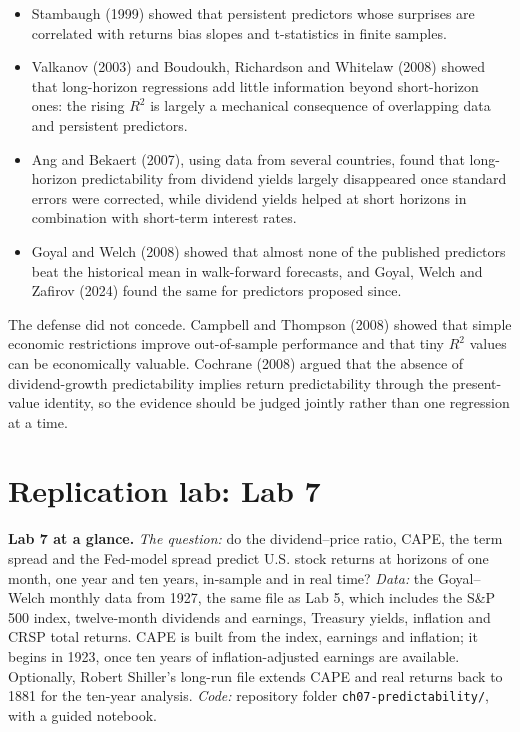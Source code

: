 \begin{itemize}
  \item Stambaugh (1999) showed that persistent predictors whose surprises are correlated with returns bias slopes and t-statistics in finite samples.
  \item Valkanov (2003) and Boudoukh, Richardson and Whitelaw (2008) showed that long-horizon regressions add little information beyond short-horizon ones: the rising $R^2$ is largely a mechanical consequence of overlapping data and persistent predictors.
  \item Ang and Bekaert (2007), using data from several countries, found that long-horizon predictability from dividend yields largely disappeared once standard errors were corrected, while dividend yields helped at short horizons in combination with short-term interest rates.
  \item Goyal and Welch (2008) showed that almost none of the published predictors beat the historical mean in walk-forward forecasts, and Goyal, Welch and Zafirov (2024) found the same for predictors proposed since.
\end{itemize}

The defense did not concede. Campbell and Thompson (2008) showed that simple economic restrictions improve out-of-sample performance and that tiny $R^2$ values can be economically valuable. Cochrane (2008) argued that the absence of dividend-growth predictability implies return predictability through the present-value identity, so the evidence should be judged jointly rather than one regression at a time.

\section{Replication lab: Lab 7}
\label{sec:07-lab}

\begin{callout}
\textbf{Lab 7 at a glance.} \emph{The question:} do the dividend--price ratio, CAPE, the term spread and the Fed-model spread predict U.S. stock returns at horizons of one month, one year and ten years, in-sample and in real time? \emph{Data:} the Goyal--Welch monthly data from 1927, the same file as Lab 5, which includes the S\&P 500 index, twelve-month dividends and earnings, Treasury yields, inflation and CRSP total returns. CAPE is built from the index, earnings and inflation; it begins in 1923, once ten years of inflation-adjusted earnings are available. Optionally, Robert Shiller's long-run file extends CAPE and real returns back to 1881 for the ten-year analysis. \emph{Code:} repository folder \texttt{ch07-predictability/}, with a guided notebook.
\end{callout}

